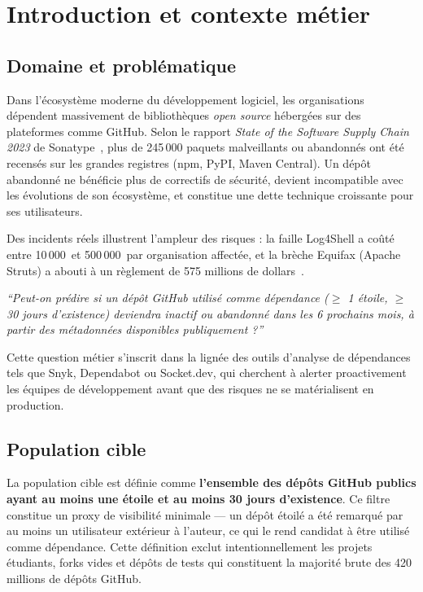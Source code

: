 \documentclass[12pt,a4paper]{article}
\begin{document}
\section{Introduction et contexte métier}

\subsection{Domaine et problématique}

Dans l'écosystème moderne du développement logiciel, les organisations dépendent massivement de bibliothèques
\textit{open source} hébergées sur des plateformes comme GitHub. Selon le rapport \textit{State of the
Software Supply Chain 2023} de Sonatype~\cite{sonatype2023}, plus de 245\,000 paquets malveillants ou
abandonnés ont été recensés sur les grandes registres (npm, PyPI, Maven Central). Un dépôt abandonné ne
bénéficie plus de correctifs de sécurité, devient incompatible avec les évolutions de son écosystème, et
constitue une dette technique croissante pour ses utilisateurs.

Des incidents réels illustrent l'ampleur des risques : la faille Log4Shell a coûté entre 10\,000\,\texteuro{}
et 500\,000\,\texteuro{} par organisation affectée, et la brèche Equifax (Apache Struts) a abouti à un
règlement de 575 millions de dollars~\cite{snyk2023}.

\begin{warnbox}
\textit{``Peut-on prédire si un dépôt GitHub utilisé comme dépendance ($\geq$ 1 étoile, $\geq$ 30 jours
d'existence) deviendra inactif ou abandonné dans les 6 prochains mois, à partir des métadonnées
disponibles publiquement ?''}
\end{warnbox}

Cette question métier s'inscrit dans la lignée des outils d'analyse de dépendances tels que Snyk,
Dependabot ou Socket.dev, qui cherchent à alerter proactivement les équipes de développement avant que
des risques ne se matérialisent en production.

\subsection{Population cible}

La population cible est définie comme \textbf{l'ensemble des dépôts GitHub publics ayant au moins une
étoile et au moins 30 jours d'existence}. Ce filtre constitue un proxy de visibilité minimale — un
dépôt étoilé a été remarqué par au moins un utilisateur extérieur à l'auteur, ce qui le rend candidat
à être utilisé comme dépendance. Cette définition exclut intentionnellement les projets étudiants,
forks vides et dépôts de tests qui constituent la majorité brute des 420 millions de dépôts GitHub.
\end{document}
